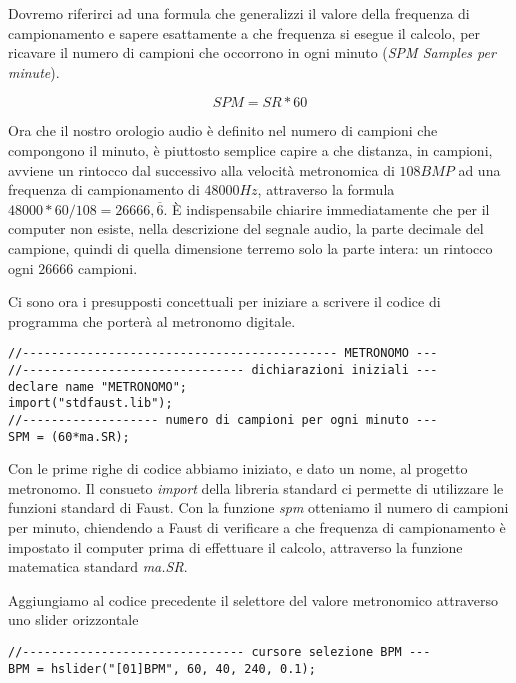 Dovremo riferirci ad una formula che generalizzi il valore della frequenza di campionamento
e sapere esattamente a che frequenza si esegue il calcolo, per ricavare il numero
di campioni che occorrono in ogni minuto (\emph{SPM Samples per minute}).

\begin{equation}
SPM = SR*60
\end{equation}

Ora che il nostro orologio audio è definito nel numero di campioni che compongono
il minuto, è piuttosto semplice capire a che distanza, in campioni, avviene un
rintocco dal successivo alla velocità metronomica di $108BMP$ ad una frequenza
di campionamento di $48000Hz$, attraverso la formula $48000*60/108=26666,\overline{6}$.
È indispensabile chiarire immediatamente che per il computer non esiste, nella
descrizione del segnale audio, la parte decimale del campione, quindi di quella
dimensione terremo solo la parte intera: un rintocco ogni $26666$ campioni.

Ci sono ora i presupposti concettuali per iniziare a scrivere il codice di programma
che porterà al metronomo digitale.

\begin{lstlisting}
//-------------------------------------------- METRONOMO ---
//------------------------------- dichiarazioni iniziali ---
declare name "METRONOMO";
import("stdfaust.lib");
//------------------- numero di campioni per ogni minuto ---
SPM = (60*ma.SR);
\end{lstlisting}

Con le prime righe di codice abbiamo iniziato, e dato un nome, al progetto metronomo.
Il consueto \emph{import} della libreria standard ci permette di utilizzare
le funzioni standard di Faust. Con la funzione \emph{spm} otteniamo il numero di
campioni per minuto, chiendendo a Faust di verificare a che frequenza di campionamento
è impostato il computer prima di effettuare il calcolo, attraverso la funzione
matematica standard \emph{ma.SR}.

Aggiungiamo al codice precedente il selettore del valore metronomico attraverso
uno slider orizzontale

\begin{lstlisting}
//------------------------------- cursore selezione BPM ---
BPM = hslider("[01]BPM", 60, 40, 240, 0.1);
\end{lstlisting}

